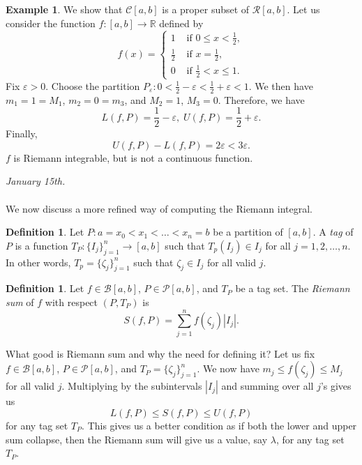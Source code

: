 \documentclass[15pt,a4paper]{book}
\theoremstyle{definition}
\newtheorem{definition}[theorem]{Definition}
\newtheorem{example}[theorem]{Example}
\newcommand{\eax}[1]{\emph{#1}\index{#1}} %
\newcommand{\abs}[1]{\left| #1 \right|} %
\newcommand{\R}{\mathbb{R}} %
\newcommand{\cP}{\mathcal{P}}
\newcommand{\cR}{\mathcal{R}}
\newcommand{\cB}{\mathcal{B}}
\newcommand{\cC}{\mathcal{C}}
\begin{document}
\begin{example}
    We show that $\cC[a,b]$ is a proper subset of $\cR[a,b]$. Let us consider the function $f:[a,b] \to \R$ defined by
    \begin{equation}
        f(x) = \begin{cases}
        1 &\text{ if } 0 \leq x < \frac{1}{2}, \\
        \frac{1}{2} &\text{ if } x = \frac{1}{2}, \\
        0 &\text{ if } \frac{1}{2} < x \leq 1.
        \end{cases}
    \end{equation}
    Fix $\varepsilon > 0$. Choose the partition $P_{\varepsilon} : 0 < \frac{1}{2}-\varepsilon < \frac{1}{2} + \varepsilon < 1$. We then have $m_{1} = 1 = M_{1}$, $m_{2} = 0 = m_{3}$, and $M_{2} = 1$, $M_{3} = 0$. Therefore, we have
    \begin{equation}
        L(f,P) = \frac{1}{2}-\varepsilon, \; U(f,P) = \frac{1}{2} + \varepsilon.
    \end{equation}
    Finally,
    \begin{equation}
        U(f,P) - L(f,P) = 2\varepsilon < 3\varepsilon.
    \end{equation}
    $f$ is Riemann integrable, but is not a continuous function.
\end{example}
\textit{January 15th.}\\ \\
We now discuss a more refined way of computing the Riemann integral.
\begin{definition}
    Let $P:a=x_{0} < x_{1} < \ldots < x_{n} = b$ be a partition of $[a,b]$. A \eax{tag} of $P$ is a function $T_{P}:\{I_{j}\}_{j=1}^{n} \to [a,b]$ such that $T_{p}(I_{j}) \in I_{j}$ for all $j = 1,2,\ldots,n$. In other words, $T_{p} = \{\zeta_{j}\}_{j=1}^{n}$ such that $\zeta_{j} \in I_{j}$ for all valid $j$.
\end{definition}
\begin{definition}
    Let $f \in \cB[a,b]$, $P \in \cP[a,b]$, and $T_{P}$ be a tag set. The \eax{Riemann sum} of $f$ with respect $(P,T_{P})$ is
    \begin{equation}
        S(f,P) = \sum_{j=1}^{n} f(\zeta_{j})\abs{I_{j}}.
    \end{equation}
\end{definition}
What good is Riemann sum and why the need for defining it? Let us fix $f \in \cB[a,b]$, $P \in \cP[a,b]$, and $T_{P} = \{\zeta_{j}\}_{j=1}^{n}$. We now have $m_{j} \leq f(\zeta_{j}) \leq M_{j}$ for all valid $j$. Multiplying by the subintervals $\abs{I_{j}}$ and summing over all $j$'s gives us
\begin{equation}
    L(f,P) \leq S(f,P) \leq U(f,P)
\end{equation}
for any tag set $T_{P}$. This gives us a better condition as if both the lower and upper sum collapse, then the Riemann sum will give us a value, say $\lambda$, for any tag set $T_{P}$.
\end{document}
